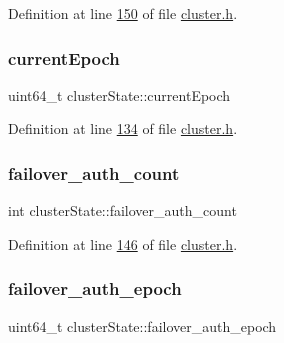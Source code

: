 Definition at line \hyperlink{cluster_8h_source_l00150}{150} of file \hyperlink{cluster_8h_source}{cluster.\+h}.

\mbox{\label{structclusterState_a5119e8f4572f08816e666b1a078ba63c}} 
\subsubsection{\texorpdfstring{current\+Epoch}{currentEpoch}}
{\footnotesize\ttfamily uint64\+\_\+t cluster\+State\+::current\+Epoch}



Definition at line \hyperlink{cluster_8h_source_l00134}{134} of file \hyperlink{cluster_8h_source}{cluster.\+h}.

\mbox{\label{structclusterState_a680bfceed44d08476cabfb4ff69e406c}} 
\subsubsection{\texorpdfstring{failover\+\_\+auth\+\_\+count}{failover\_auth\_count}}
{\footnotesize\ttfamily int cluster\+State\+::failover\+\_\+auth\+\_\+count}



Definition at line \hyperlink{cluster_8h_source_l00146}{146} of file \hyperlink{cluster_8h_source}{cluster.\+h}.

\mbox{\label{structclusterState_a0b155aa7170d100f391bceb01660813d}} 
\subsubsection{\texorpdfstring{failover\+\_\+auth\+\_\+epoch}{failover\_auth\_epoch}}
{\footnotesize\ttfamily uint64\+\_\+t cluster\+State\+::failover\+\_\+auth\+\_\+epoch}



